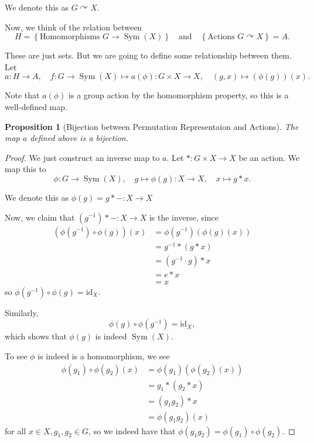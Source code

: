 \documentclass{article}
\newtheorem{proposition}[theorem]{Proposition}
\theoremstyle{definition}
\theoremstyle{remark}
\newcommand{\pqty}[1]{\left(#1\right)}
\newcommand{\Bqty}[1]{\left\{#1\right\}}
\newcommand{\functiondomain}[3]{#1:#2\to #3}
\newcommand{\function}[5]{#1:#2\to #3,\quad #4\mapsto #5}
\newcommand{\qand}{\quad\text{and}\quad}
\newcommand{\inverse}{^{-1}}
\newcommand{\actson}{\curvearrowright}
\newcommand{\identity}{\mathrm{id}}
\newcommand{\Sym}{\operatorname{Sym}}
\begin{document}
We denote this as \(G \actson X\).

Now, we think of the relation between
\[
    H = \Bqty{\text{Homomorphisms } G \to \Sym\pqty{X}} \qand \Bqty{\text{Actions } G \actson X} = A.
\]

These are just sets. But we are going to define some relationship between them. Let
\[
    \function{a}{H}{A}{
        \functiondomain{f}{G}{\Sym\pqty{X}}}{
            \function{a\pqty{\phi}}{G\times X}{X}{\pqty{g, x}}{\pqty{\phi\pqty{g}}\pqty{x}.}
        }
\]

Note that \(a\pqty{\phi}\) is a group action by the homomorphism property, so this is a well-defined map.

\begin{proposition}[Bijection between Permutation Representaion and Actions]
    \label{prop:permutation-representation-actions}%
    The map \(a\) defined above is a bijection.
\end{proposition}

\begin{proof}
    We just construct an inverse map to \(a\). Let \(\functiondomain{\ast}{G \times X}{X}\) be an action. We map this to
    \[
        \function{\phi}{G}{\Sym\pqty{X}}{g}{\function{\phi\pqty{g}}{X}{X}{x}{g \ast x}.}
    \]

    We denote this as \(\phi\pqty{g} = g \ast - : X \to X\)

    Now, we claim that \(\pqty{g\inverse} \ast -: X \to X\) is the inverse, since
    \begin{align*}
        \pqty{\phi\pqty{g\inverse} \circ \phi\pqty{g}} \pqty{x} &= \phi\pqty{g\inverse} \pqty{\phi\pqty{g} \pqty{x}} \\
        &= g\inverse \ast \pqty{g \ast x} \\
        &= \pqty{g\inverse \cdot g} \ast x \\
        &= e \ast x \\
        &= x
    \end{align*}
    so \(\phi\pqty{g\inverse} \circ \phi\pqty{g} = \identity_X\).

    Similarly,
    \[
        \phi\pqty{g} \circ \phi\pqty{g\inverse} = \identity_X,
    \]
    which shows that \(\phi\pqty{g}\) is indeed \(\Sym\pqty{X}\).

    To see \(\phi\) is indeed is a homomorphism, we see
    \begin{align*}
        \phi\pqty{g_1} \circ \phi\pqty{g_2} \pqty{x} &= \phi\pqty{g_1} \pqty{\phi\pqty{g_2} \pqty{x}} \\
        &= g_1 \ast \pqty{g_2 \ast x} \\
        &= \pqty{g_1 g_2} \ast x \\
        &= \phi\pqty{g_1 g_2} \pqty{x}
    \end{align*}
    for all \(x \in X, g_1, g_2 \in G\), so we indeed have that \(\phi\pqty{g_1 g_2} = \phi\pqty{g_1} \circ \phi\pqty{g_2}\).
\end{proof}
\end{document}
